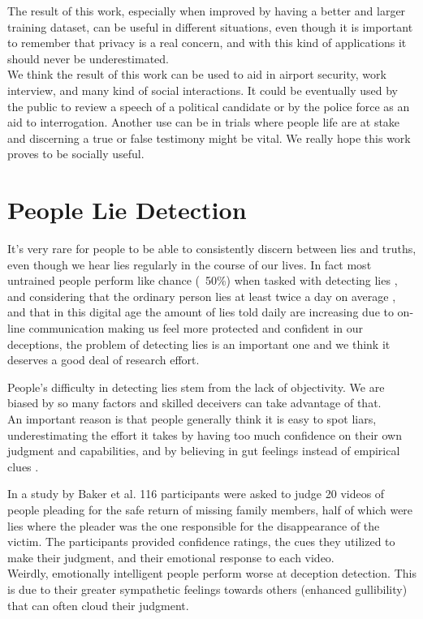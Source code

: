 The result of this work, especially when improved by having a better and larger training dataset, can be useful in different situations, even though it is important to remember that privacy is a real concern, and with this kind of applications it should never be underestimated.\\
We think the result of this work can be used to aid in airport security, work interview, and many kind of social interactions. It could be eventually used by the public to review a speech of a political candidate or by the police force as an aid to interrogation. Another use can be in trials where people life are at stake and discerning a true or false testimony might be vital. We really hope this work proves to be socially useful.

\pagebreak

\section{People Lie Detection} \label{pplLieDet}
It's very rare for people to be able to consistently discern between lies and truths, even though we hear lies regularly in the course of our lives. In fact most untrained people perform like chance (~50\%) when tasked with detecting lies \cite{Porter2012SecretsAL}, and considering that the ordinary person lies at least twice a day on average \cite{LyingEverydayLife}, and that in this digital age the amount of lies told daily are increasing \cite{DigitalDeception} due to on-line communication making us feel more protected and confident in our deceptions, the problem of detecting lies is an important one and we think it deserves a good deal of research effort. 

People's difficulty in detecting lies stem from the lack of objectivity. We are biased by so many factors and skilled deceivers can take advantage of that. \\
An important reason is that people generally think it is easy to spot liars, underestimating the effort it takes by having too much confidence on their own judgment and capabilities, and by believing in gut feelings instead of empirical clues \cite{VrijDLD}. 

In a study by Baker et al.  \cite{EmotionallyIntelligent} 116 participants were asked to judge 20 videos of people pleading for the safe return of missing family members, half of which were lies where the pleader was the one responsible for the disappearance of the victim. The participants provided confidence ratings, the cues they utilized to make their judgment, and their emotional response to each video.\\
Weirdly, emotionally intelligent people perform worse at deception detection. This is due to their greater sympathetic feelings towards others (enhanced gullibility) that can often cloud their judgment.

